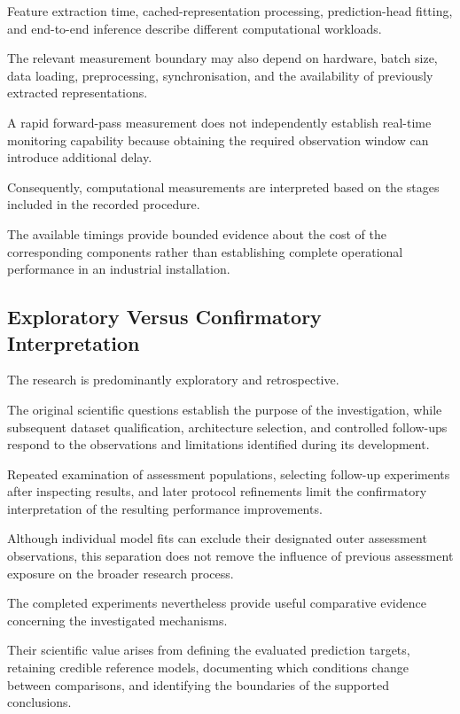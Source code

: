 Feature extraction time, cached-representation processing, prediction-head fitting, and end-to-end inference describe different computational workloads.

The relevant measurement boundary may also depend on hardware, batch size, data loading, preprocessing, synchronisation, and the availability of previously extracted representations.

A rapid forward-pass measurement does not independently establish real-time monitoring capability because obtaining the required observation window can introduce additional delay.

Consequently, computational measurements are interpreted based on the stages included in the recorded procedure.

The available timings provide bounded evidence about the cost of the corresponding components rather than establishing complete operational performance in an industrial installation.

\subsection{Exploratory Versus Confirmatory Interpretation}

The research is predominantly exploratory and retrospective.

The original scientific questions establish the purpose of the investigation, while subsequent dataset qualification, architecture selection, and controlled follow-ups respond to the observations and limitations identified during its development.

Repeated examination of assessment populations, selecting follow-up experiments after inspecting results, and later protocol refinements limit the confirmatory interpretation of the resulting performance improvements.

Although individual model fits can exclude their designated outer assessment observations, this separation does not remove the influence of previous assessment exposure on the broader research process.

The completed experiments nevertheless provide useful comparative evidence concerning the investigated mechanisms.

Their scientific value arises from defining the evaluated prediction targets, retaining credible reference models, documenting which conditions change between comparisons, and identifying the boundaries of the supported conclusions.

